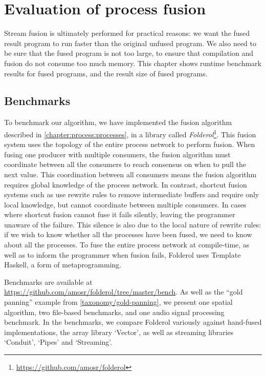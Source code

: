 \chapter{Evaluation of process fusion}
\label{s:Benchmarks}
Stream fusion is ultimately performed for practical reasons: we want the fused result program to run faster than the original unfused program.
We also need to be sure that the fused program is not too large, to ensure that compilation and fusion do not consume too much memory.
This chapter shows runtime benchmark results for fused programs, and the result size of fused programs.

\section{Benchmarks}

To benchmark our algorithm, we have implemented the fusion algorithm described in \cref{chapter:process:processes}, in a library called \emph{Folderol}\footnote{\url{https://github.com/amosr/folderol}}.
This fusion system uses the topology of the entire process network to perform fusion.
When fusing one producer with multiple consumers, the fusion algorithm must coordinate between all the consumers to reach consensus on when to pull the next value.
This coordination between all consumers means the fusion algorithm requires global knowledge of the process network.
In contrast, shortcut fusion systems such as \cite{gill1993short} use rewrite rules to remove intermediate buffers and require only local knowledge, but cannot coordinate between multiple consumers.
In cases where shortcut fusion cannot fuse it fails silently, leaving the programmer unaware of the failure.
This silence is also due to the local nature of rewrite rules: if we wish to know whether all the processes have been fused, we need to know about all the processes.
To fuse the entire process network at compile-time, as well as to inform the programmer when fusion fails, Folderol uses Template Haskell, a form of metaprogramming.

Benchmarks are available at \url{https://github.com/amosr/folderol/tree/master/bench}.
As well as the ``gold panning'' example from \cref{taxonomy/gold-panning}, we present one spatial algorithm, two file-based benchmarks, and one audio signal processing benchmark.
In the benchmarks, we compare Folderol variously against hand-fused implementations, the array library `Vector'\cite{hackage:vector}, as well as streaming libraries `Conduit'\cite{hackage:conduit}, `Pipes'\cite{hackage:pipes} and `Streaming'\cite{hackage:streaming}.


